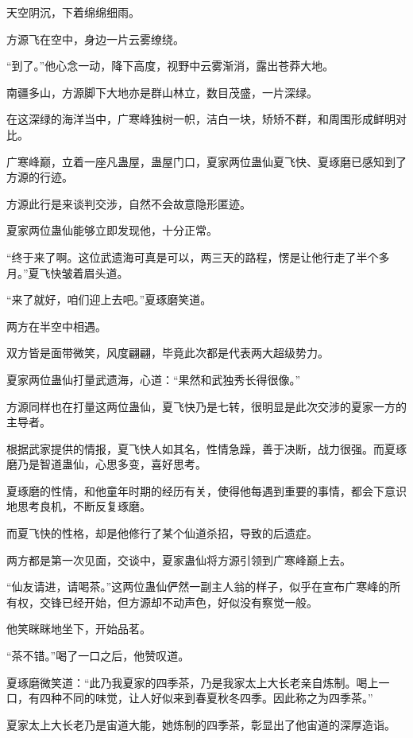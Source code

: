
\begin{this_body}

天空阴沉，下着绵绵细雨。

方源飞在空中，身边一片云雾缭绕。

“到了。”他心念一动，降下高度，视野中云雾渐消，露出苍莽大地。

南疆多山，方源脚下大地亦是群山林立，数目茂盛，一片深绿。

在这深绿的海洋当中，广寒峰独树一帜，洁白一块，矫矫不群，和周围形成鲜明对比。

广寒峰巅，立着一座凡蛊屋，蛊屋门口，夏家两位蛊仙夏飞快、夏琢磨已感知到了方源的行迹。

方源此行是来谈判交涉，自然不会故意隐形匿迹。

夏家两位蛊仙能够立即发现他，十分正常。

“终于来了啊。这位武遗海可真是可以，两三天的路程，愣是让他行走了半个多月。”夏飞快皱着眉头道。

“来了就好，咱们迎上去吧。”夏琢磨笑道。

两方在半空中相遇。

双方皆是面带微笑，风度翩翩，毕竟此次都是代表两大超级势力。

夏家两位蛊仙打量武遗海，心道：“果然和武独秀长得很像。”

方源同样也在打量这两位蛊仙，夏飞快乃是七转，很明显是此次交涉的夏家一方的主导者。

根据武家提供的情报，夏飞快人如其名，性情急躁，善于决断，战力很强。而夏琢磨乃是智道蛊仙，心思多变，喜好思考。

夏琢磨的性情，和他童年时期的经历有关，使得他每遇到重要的事情，都会下意识地思考良机，不断反复琢磨。

而夏飞快的性格，却是他修行了某个仙道杀招，导致的后遗症。

两方都是第一次见面，交谈中，夏家蛊仙将方源引领到广寒峰巅上去。

“仙友请进，请喝茶。”这两位蛊仙俨然一副主人翁的样子，似乎在宣布广寒峰的所有权，交锋已经开始，但方源却不动声色，好似没有察觉一般。

他笑眯眯地坐下，开始品茗。

“茶不错。”喝了一口之后，他赞叹道。

夏琢磨微笑道：“此乃我夏家的四季茶，乃是我家太上大长老亲自炼制。喝上一口，有四种不同的味觉，让人好似来到春夏秋冬四季。因此称之为四季茶。”

夏家太上大长老乃是宙道大能，她炼制的四季茶，彰显出了他宙道的深厚造诣。


\end{this_body}
